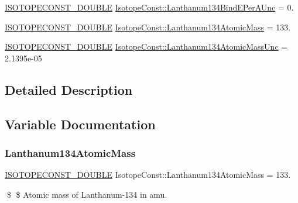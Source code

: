\begin{DoxyCompactItemize}
\mbox{\hyperlink{group___isotope_const-_macros_ga8f45a7272ce02c0b4c65c44636ed719a}{I\+S\+O\+T\+O\+P\+E\+C\+O\+N\+S\+T\+\_\+\+D\+O\+U\+B\+LE}} \mbox{\hyperlink{group___isotope_const-_lanthanum-_la134_gaf271dd8728e41ce7823dfe45f3307f3e}{Isotope\+Const\+::\+Lanthanum134\+Bind\+E\+Per\+A\+Unc}} = 0.
\item 
\mbox{\hyperlink{group___isotope_const-_macros_ga8f45a7272ce02c0b4c65c44636ed719a}{I\+S\+O\+T\+O\+P\+E\+C\+O\+N\+S\+T\+\_\+\+D\+O\+U\+B\+LE}} \mbox{\hyperlink{group___isotope_const-_lanthanum-_la134_ga1c46dc8f035749a79597f9572f46bed1}{Isotope\+Const\+::\+Lanthanum134\+Atomic\+Mass}} = 133.
\item 
\mbox{\hyperlink{group___isotope_const-_macros_ga8f45a7272ce02c0b4c65c44636ed719a}{I\+S\+O\+T\+O\+P\+E\+C\+O\+N\+S\+T\+\_\+\+D\+O\+U\+B\+LE}} \mbox{\hyperlink{group___isotope_const-_lanthanum-_la134_gad1112d52f366f6da71ecab3691b5acdf}{Isotope\+Const\+::\+Lanthanum134\+Atomic\+Mass\+Unc}} = 2.\+1395e-\/05
\end{DoxyCompactItemize}


\subsection{Detailed Description}


\subsection{Variable Documentation}
\mbox{\label{group___isotope_const-_lanthanum-_la134_ga1c46dc8f035749a79597f9572f46bed1}} 
\subsubsection{\texorpdfstring{Lanthanum134\+Atomic\+Mass}{Lanthanum134AtomicMass}}
{\footnotesize\ttfamily \mbox{\hyperlink{group___isotope_const-_macros_ga8f45a7272ce02c0b4c65c44636ed719a}{I\+S\+O\+T\+O\+P\+E\+C\+O\+N\+S\+T\+\_\+\+D\+O\+U\+B\+LE}} Isotope\+Const\+::\+Lanthanum134\+Atomic\+Mass = 133.}

\$ \$ Atomic mass of Lanthanum-\/134 in amu. \mbox{\label{group___isotope_const-_lanthanum-_la134_gad1112d52f366f6da71ecab3691b5acdf}} 
